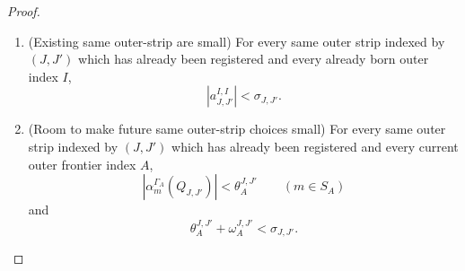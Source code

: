 \documentclass[11pt,reqno]{amsart}
\makeatletter
\theoremstyle{plain}
\theoremstyle{definition}
\newcounter{problempaper}
\newenvironment{problempaperbody}{%
  \setcounter{subsection}{0}%
  \setcounter{subsubsection}{0}%
  \setcounter{paragraph}{0}%
  \renewcommand{\thesubsection}{\arabic{subsection}}%
  \renewcommand{\thesubsubsection}{\thesubsection.\arabic{subsubsection}}%
  \renewcommand{\theparagraph}{\thesubsubsection.\arabic{paragraph}}%
  \let\problem@outersection\section
  \let\problem@outersubsection\subsection
  \let\problem@outersubsubsection\subsubsection
  \let\problem@outerparagraph\paragraph
  \let\section\problem@papersection
  \let\subsection\problem@papersubsection
  \let\subsubsection\problem@papersubsubsection
}{%
  \let\section\problem@outersection
  \let\subsection\problem@outersubsection
  \let\subsubsection\problem@outersubsubsection
  \let\paragraph\problem@outerparagraph
}
\newcommand{\problem@target}[2]{%
  \hypertarget{problem-\theproblempaper-#1-#2}{}%
}
\newcommand{\problem@paperheading}[3]{%
  \par\bigskip
  \problem@target{#1}{#2}%
  \noindent{\large\bfseries #2.\quad #3\par}%
  \nobreak\smallskip
}
\newcommand{\problem@papersubheading}[3]{%
  \par\medskip
  \problem@target{#1}{#2}%
  \noindent{\normalsize\bfseries #2.\quad #3\par}%
  \nobreak\smallskip
}
\newcommand{\problem@papersubsubheading}[3]{%
  \par\smallskip
  \problem@target{#1}{#2}%
  \noindent{\normalsize\itshape #2.\quad #3.\ }%
}
\def\problem@papersection{%
  \@ifstar{\problem@papersectionstar}{\problem@papersectionnostar}%
}
\def\problem@papersectionstar#1{%
  \par\bigskip\noindent{\large\bfseries #1\par}\nobreak\smallskip
}
\def\problem@papersectionnostar#1{%
  \refstepcounter{subsection}%
  \setcounter{subsubsection}{0}%
  \setcounter{paragraph}{0}%
  \problem@paperheading{section}{\thesubsection}{#1}%
  \problem@writecontentsline{section}{\thesubsection}{#1}%
}
\def\problem@papersubsection{%
  \@ifstar{\problem@papersubsectionstar}{\problem@papersubsectionnostar}%
}
\def\problem@papersubsectionstar#1{%
  \par\medskip\noindent{\normalsize\bfseries #1\par}\nobreak\smallskip
}
\def\problem@papersubsectionnostar#1{%
  \refstepcounter{subsubsection}%
  \setcounter{paragraph}{0}%
  \problem@papersubheading{subsection}{\thesubsubsection}{#1}%
  \problem@writecontentsline{subsection}{\thesubsubsection}{#1}%
}
\def\problem@papersubsubsection{%
  \@ifstar{\problem@papersubsubsectionstar}{\problem@papersubsubsectionnostar}%
}
\def\problem@papersubsubsectionstar#1{%
  \par\smallskip\noindent{\normalsize\itshape #1.\ }%
}
\def\problem@papersubsubsectionnostar#1{%
  \refstepcounter{paragraph}%
  \problem@papersubsubheading{subsubsection}{\theparagraph}{#1}%
  \problem@writecontentsline{subsubsection}{\theparagraph}{#1}%
}
\newcommand{\problem@writecontentsline}[3]{%
  \begingroup
  \protected@write\@auxout{}{%
    \string\problemcontentsentry{\theproblempaper}{#1}{#2}{#3}{\thepage}%
  }%
  \endgroup
}
\newcommand{\problemcontentsentry}[5]{%
  \@ifundefined{problemcontents@#1}{%
    \expandafter\gdef\csname problemcontents@#1\endcsname{}%
  }{}%
  \expandafter\g@addto@macro\csname problemcontents@#1\endcsname{%
    \problemcontentsline{#1}{#2}{#3}{#4}{#5}%
  }%
}
\newcommand{\problemcontentslink}[4]{%
  \hyperlink{problem-#1-#2-#3}{#4}%
}
\newcommand{\problemcontentsline}[5]{%
  \ifstrequal{#2}{section}{%
    \par\noindent
    \problemcontentslink{#1}{#2}{#3}{\makebox[2.5em][l]{#3}#4}%
    \nobreak\dotfill
    \problemcontentslink{#1}{#2}{#3}{#5}\par
  }{%
    \ifstrequal{#2}{subsection}{%
      \par\noindent\hspace*{1.5em}%
      \problemcontentslink{#1}{#2}{#3}{\makebox[3.5em][l]{#3}#4}%
      \nobreak\dotfill
      \problemcontentslink{#1}{#2}{#3}{#5}\par
    }{%
      \par\noindent\hspace*{3em}%
      \problemcontentslink{#1}{#2}{#3}{\makebox[4.5em][l]{#3}#4}%
      \nobreak\dotfill
      \problemcontentslink{#1}{#2}{#3}{#5}\par
    }%
  }%
}
\makeatother
\begin{document}
\begin{problempaperbody}
\begin{proof}
\begin{enumerate}[label=\textup{(E\arabic*)},ref=E\arabic*]
\item\label{p3:item:estimate-outer-coefficients} (Existing same outer-strip are small) For every same outer strip indexed by $(J,J')$ which has already been registered and every already born outer index $I$,
\begin{equation}
\label{p3:eq:same-outer-old-coefficients}
        |a_{J,J'}^{I,I}|<\sigma_{J,J'}.
\end{equation}
\item\label{p3:item:estimate-outer-tails}(Room to make future same outer-strip choices small) For every same outer strip indexed by $(J,J')$ which has already been registered and every current outer frontier index $A$,
\begin{equation}
\label{p3:eq:outer-tail-invariant}
        |\alpha_m^{\Gamma_A}(Q_{J,J'})|<\theta_A^{J,J'}\qquad(m\in S_A)
\end{equation}
and
\begin{equation}
\label{p3:eq:outer-room-invariant}
        \theta_A^{J,J'}+\omega_A^{J,J'}<\sigma_{J,J'}.
\end{equation}


\end{enumerate}
\end{proof}
\end{problempaperbody}
\end{document}
